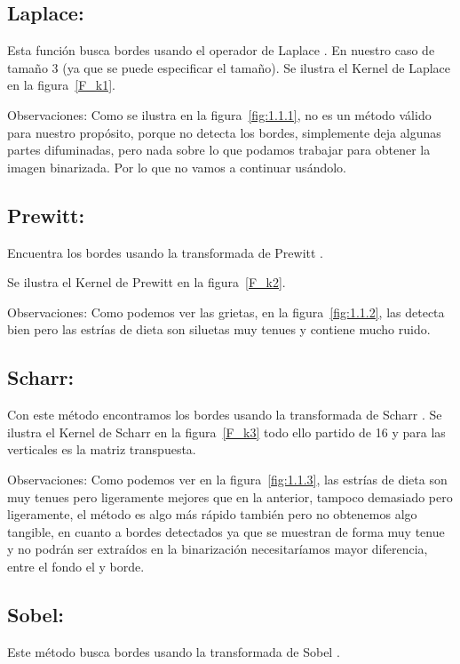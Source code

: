 \subsection{Laplace:}
Esta función busca bordes usando el operador de Laplace \cite{wiki:Laplace}. En nuestro caso de tamaño 3 (ya que se puede especificar el tamaño).
Se ilustra el Kernel de Laplace en la figura~\ref{F_k1}.


Observaciones:
Como se ilustra en la figura~\ref{fig:1.1.1}, no es un método válido para nuestro propósito, porque no detecta los bordes, simplemente deja algunas partes difuminadas, pero nada sobre lo que podamos trabajar para obtener la imagen binarizada. Por lo que no vamos a continuar usándolo.

\subsection{Prewitt:}

Encuentra los bordes usando la transformada de Prewitt \cite{wiki:Prewitt}.

Se ilustra el Kernel de Prewitt en la figura~\ref{F_k2}.



Observaciones:
Como podemos ver las grietas, en la figura~\ref{fig:1.1.2}, las detecta bien pero las estrías de dieta son siluetas muy tenues y contiene mucho ruido.


\subsection{Scharr:}
Con este método encontramos los bordes usando la transformada de Scharr \cite{wiki:Scharr}.
Se ilustra el Kernel de Scharr en la figura~\ref{F_k3} todo ello partido de 16 y para las verticales es la matriz transpuesta. 




Observaciones:
Como podemos ver en la figura~\ref{fig:1.1.3}, las estrías de dieta son muy tenues pero ligeramente mejores que en la anterior, tampoco demasiado pero ligeramente, el método es algo más rápido también pero no obtenemos algo tangible, en cuanto  a bordes detectados ya que se muestran de forma muy tenue y no podrán ser extraídos en la binarización necesitaríamos mayor diferencia, entre el fondo el y borde.




\subsection{Sobel:}
Este método busca bordes usando la transformada de Sobel \cite{wiki:Sobel}.

